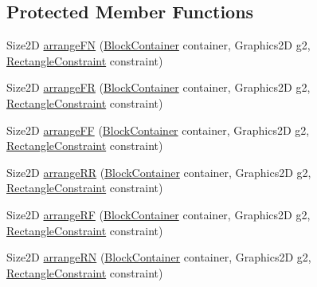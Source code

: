 \subsection*{Protected Member Functions}
\begin{DoxyCompactItemize}
\item 
Size2D \mbox{\hyperlink{classorg_1_1jfree_1_1chart_1_1block_1_1_center_arrangement_a6dcaafba35f3543c4d5a2726263708a9}{arrange\+FN}} (\mbox{\hyperlink{classorg_1_1jfree_1_1chart_1_1block_1_1_block_container}{Block\+Container}} container, Graphics2D g2, \mbox{\hyperlink{classorg_1_1jfree_1_1chart_1_1block_1_1_rectangle_constraint}{Rectangle\+Constraint}} constraint)
\item 
Size2D \mbox{\hyperlink{classorg_1_1jfree_1_1chart_1_1block_1_1_center_arrangement_ae2c1a0e165835c4577e19abe1e94c3da}{arrange\+FR}} (\mbox{\hyperlink{classorg_1_1jfree_1_1chart_1_1block_1_1_block_container}{Block\+Container}} container, Graphics2D g2, \mbox{\hyperlink{classorg_1_1jfree_1_1chart_1_1block_1_1_rectangle_constraint}{Rectangle\+Constraint}} constraint)
\item 
Size2D \mbox{\hyperlink{classorg_1_1jfree_1_1chart_1_1block_1_1_center_arrangement_a4d369106dafb827556626e6575e109c6}{arrange\+FF}} (\mbox{\hyperlink{classorg_1_1jfree_1_1chart_1_1block_1_1_block_container}{Block\+Container}} container, Graphics2D g2, \mbox{\hyperlink{classorg_1_1jfree_1_1chart_1_1block_1_1_rectangle_constraint}{Rectangle\+Constraint}} constraint)
\item 
Size2D \mbox{\hyperlink{classorg_1_1jfree_1_1chart_1_1block_1_1_center_arrangement_a79e46bca7910c3e25849fccd661112da}{arrange\+RR}} (\mbox{\hyperlink{classorg_1_1jfree_1_1chart_1_1block_1_1_block_container}{Block\+Container}} container, Graphics2D g2, \mbox{\hyperlink{classorg_1_1jfree_1_1chart_1_1block_1_1_rectangle_constraint}{Rectangle\+Constraint}} constraint)
\item 
Size2D \mbox{\hyperlink{classorg_1_1jfree_1_1chart_1_1block_1_1_center_arrangement_a3f9e3224ff29cb37c38d07e9f4040835}{arrange\+RF}} (\mbox{\hyperlink{classorg_1_1jfree_1_1chart_1_1block_1_1_block_container}{Block\+Container}} container, Graphics2D g2, \mbox{\hyperlink{classorg_1_1jfree_1_1chart_1_1block_1_1_rectangle_constraint}{Rectangle\+Constraint}} constraint)
\item 
Size2D \mbox{\hyperlink{classorg_1_1jfree_1_1chart_1_1block_1_1_center_arrangement_a4107c5a77624ff8279c82e87115ceeee}{arrange\+RN}} (\mbox{\hyperlink{classorg_1_1jfree_1_1chart_1_1block_1_1_block_container}{Block\+Container}} container, Graphics2D g2, \mbox{\hyperlink{classorg_1_1jfree_1_1chart_1_1block_1_1_rectangle_constraint}{Rectangle\+Constraint}} constraint)

\end{DoxyCompactItemize}
